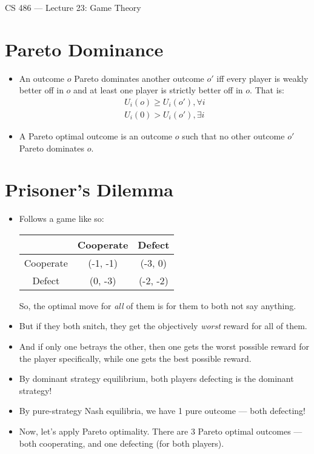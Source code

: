 \documentclass{article}
\author{Clement Tsang}
\begin{document}
\begin{center}
    \Large{CS 486 --- Lecture 23: Game Theory}
\end{center}

\section{Pareto Dominance}
\begin{itemize}
    \item An outcome $o$ Pareto dominates another outcome $o'$ iff every player is weakly better off in $o$ and at least one player is strictly better off in $o$.  That is:
        \begin{align*}
            U_i(o) \geq U_i(o'), \forall i \\
            U_i(0) > U_i(o'), \exists i
        \end{align*}
    \item A Pareto optimal outcome is an outcome $o$ such that no other outcome $o'$ Pareto dominates $o$.
\end{itemize}

\section{Prisoner's Dilemma}
\begin{itemize}
    \item Follows a game like so:
        \begin{table}[h!]
            \centering
            \begin{tabular}{|c|c|c|}
            \hline
                      & Cooperate & Defect   \\ \hline
            Cooperate & (-1, -1)  & (-3, 0)  \\ \hline
            Defect    & (0, -3)   & (-2, -2) \\ \hline
            \end{tabular}
        \end{table}
        So, the optimal move for \emph{all} of them is for them to both not say anything.
    \item But if they both snitch, they get the objectively \emph{worst} reward for all of them.
    \item And if only  one betrays the other, then one gets the worst possible reward for the player specifically, while one gets the best possible reward.
    \item By dominant strategy equilibrium, both players defecting is the dominant strategy!
    \item By pure-strategy Nash equilibria, we have 1 pure outcome --- both defecting!
    \item Now, let's apply Pareto optimality.  There are 3 Pareto optimal outcomes --- both cooperating, and one defecting (for both players).
\end{itemize}
\end{document}
